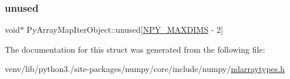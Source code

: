 \mbox{\label{structPyArrayMapIterObject_a02d72d04db522c5ae11df7802b3fe650}} 
\subsubsection{\texorpdfstring{unused}{unused}}
{\footnotesize\ttfamily void$\ast$ Py\+Array\+Map\+Iter\+Object\+::unused\mbox{[}\hyperlink{ndarraytypes_8h_a737679ea9ee902bfa707c146051c17b5}{N\+P\+Y\+\_\+\+M\+A\+X\+D\+I\+MS} -\/ 2\mbox{]}}



The documentation for this struct was generated from the following file\+:\begin{DoxyCompactItemize}
\item 
venv/lib/python3./site-\/packages/numpy/core/include/numpy/\hyperlink{ndarraytypes_8h}{ndarraytypes.\+h}\end{DoxyCompactItemize}
